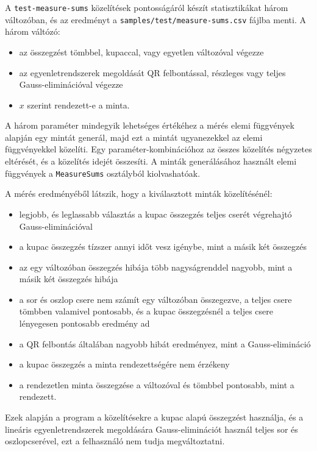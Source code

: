 A \texttt{test-measure-sums} közelítések pontosságáról készít statisztikákat három változóban, és az eredményt a \texttt{samples/test/measure-sums.csv} fájlba menti.
A három váltózó:
\begin{itemize}
\item az összegzést tömbbel, kupaccal, vagy egyetlen változóval végezze
\item az egyenletrendszerek megoldását QR felbontással, részleges vagy teljes Gauss-eliminációval végezze
\item $x$ szerint rendezett-e a minta.
\end{itemize}
A három paraméter mindegyik lehetséges értékéhez a mérés elemi függvények alapján egy mintát generál, majd ezt a mintát ugyanezekkel az elemi függvényekkel közelíti.
Egy paraméter-kombinációhoz az összes közelítés négyzetes eltérését, és a közelítés idejét összesíti.
A minták generálásához használt elemi függvények a \texttt{MeasureSums} osztályból kiolvashatóak.

A mérés eredményéből látszik, hogy a kiválasztott minták közelítésénél:
\begin{itemize}
\item legjobb, és leglassabb választás a kupac összegzés teljes cserét végrehajtó Gauss-eliminációval
\item a kupac összegzés tízszer annyi időt vesz igénybe, mint a másik két összegzés
\item az egy változóban összegzés hibája több nagyságrenddel nagyobb, mint a másik két összegzés hibája
\item a sor és oszlop csere nem számít egy változóban összegezve, a teljes csere tömbben valamivel pontosabb, és a kupac összegzésnél a teljes csere lényegesen pontosabb eredmény ad
\item a QR felbontás általában nagyobb hibát eredményez, mint a Gauss-elimináció
\item a kupac összegzés a minta rendezettségére nem érzékeny
\item a rendezetlen minta összegzése a változóval és tömbbel pontosabb, mint a rendezett.
\end{itemize}
Ezek alapján a program a közelítésekre a kupac alapú összegzést használja, és a lineáris egyenletrendszerek megoldására Gauss-eliminációt használ teljes sor és oszlopcserével, ezt a felhasználó nem tudja megváltoztatni.

